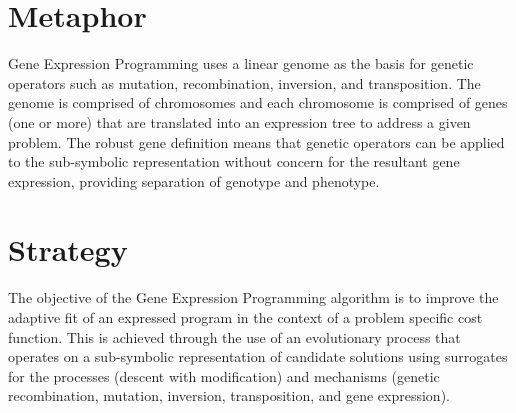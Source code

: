 \documentclass[a4paper, 11pt]{article}
\begin{document}
\section{Metaphor}
\label{sec:metaphor}
Gene Expression Programming uses a linear genome as the basis for genetic operators such as mutation, recombination, inversion, and transposition. The genome is comprised of chromosomes and each chromosome is comprised of genes (one or more) that are translated into an expression tree to address a given problem. The robust gene definition means that genetic operators can be applied to the sub-symbolic representation without concern for the resultant gene expression, providing separation of genotype and phenotype.

\section{Strategy}
\label{sec:strategy}
The objective of the Gene Expression Programming algorithm is to improve the adaptive fit of an expressed program in the context of a problem specific cost function.
This is achieved through the use of an evolutionary process that operates on a sub-symbolic representation of candidate solutions using surrogates for the processes (descent with modification) and mechanisms (genetic recombination, mutation, inversion, transposition, and gene expression).
\end{document}
